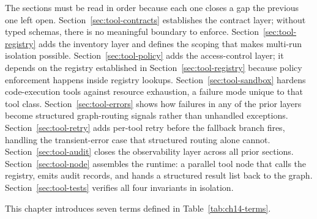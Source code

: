 The sections must be read in order because each one closes a gap the
previous one left open. Section~\ref{sec:tool-contracts} establishes the
contract layer; without typed schemas, there is no meaningful boundary to
enforce. Section~\ref{sec:tool-registry} adds the inventory layer and
defines the scoping that makes multi-run isolation possible.
Section~\ref{sec:tool-policy} adds the access-control layer; it depends on
the registry established in Section~\ref{sec:tool-registry} because policy
enforcement happens inside registry lookups. Section~\ref{sec:tool-sandbox}
hardens code-execution tools against resource exhaustion, a failure mode
unique to that tool class. Section~\ref{sec:tool-errors} shows how failures
in any of the prior layers become structured graph-routing signals rather
than unhandled exceptions. Section~\ref{sec:tool-retry} adds per-tool retry
before the fallback branch fires, handling the transient-error case that
structured routing alone cannot. Section~\ref{sec:tool-audit} closes the
observability layer across all prior sections. Section~\ref{sec:tool-node}
assembles the runtime: a parallel tool node that calls the registry, emits
audit records, and hands a structured result list back to the graph.
Section~\ref{sec:tool-tests} verifies all four invariants in isolation.

This chapter introduces seven terms defined in
Table~\ref{tab:ch14-terms}.

